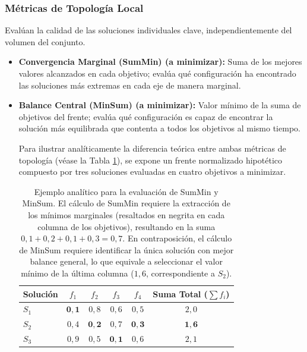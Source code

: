 \subsubsection{Métricas de Topología Local}

Evalúan la calidad de las soluciones individuales clave, independientemente del volumen del conjunto.

\begin{itemize}
    \item \textbf{Convergencia Marginal (SumMin) (a minimizar):} Suma de los mejores valores alcanzados en cada objetivo; evalúa qué configuración ha encontrado las soluciones más extremas en cada eje de manera marginal.
    
    \item \textbf{Balance Central (MinSum) (a minimizar):} Valor mínimo de la suma de objetivos del frente; evalúa qué configuración es capaz de encontrar la solución más equilibrada que contenta a todos los objetivos al mismo tiempo.

    Para ilustrar analíticamente la diferencia teórica entre ambas métricas de topología (véase la Tabla \ref{tab:metric_sum}), se expone un frente normalizado hipotético compuesto por tres soluciones evaluadas en cuatro objetivos a minimizar.

\begin{table}[H]
    \centering
    \begin{tabular}{lcccc|c}
        \hline
        \textbf{Solución} & \textbf{$f_1$} & \textbf{$f_2$} & \textbf{$f_3$} & \textbf{$f_4$} & \textbf{Suma Total ($\sum f_i$)} \\
        \hline
        $S_1$ & $\mathbf{0{,}1}$ & $0{,}8$ & $0{,}6$ & $0{,}5$ & $2{,}0$ \\
        $S_2$ & $0{,}4$ & $\mathbf{0{,}2}$ & $0{,}7$ & $\mathbf{0{,}3}$ & $\mathbf{1{,}6}$ \\
        $S_3$ & $0{,}9$ & $0{,}5$ & $\mathbf{0{,}1}$ & $0{,}6$ & $2{,}1$ \\
        \hline
    \end{tabular}
    \caption[Evaluación analítica de SumMin y MinSum]{Ejemplo analítico para la evaluación de SumMin y MinSum. El cálculo de SumMin requiere la extracción de los mínimos marginales (resaltados en negrita en cada columna de los objetivos), resultando en la suma $0{,}1 + 0{,}2 + 0{,}1 + 0{,}3 = 0{,}7$. En contraposición, el cálculo de MinSum requiere identificar la única solución con mejor balance general, lo que equivale a seleccionar el valor mínimo de la última columna ($1{,}6$, correspondiente a $S_2$).}
    \label{tab:metric_sum}
\end{table}
\end{itemize}

